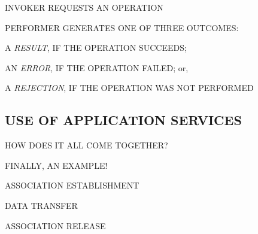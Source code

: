 \begin{bwslide}

\begin{nrtc}
\item	INVOKER REQUESTS AN OPERATION

\item	PERFORMER GENERATES ONE OF THREE OUTCOMES:
    \begin{nrtc}
    \item       A \emph{RESULT}, IF THE OPERATION SUCCEEDS;

    \item       AN \emph{ERROR}, IF THE OPERATION FAILED; or,

    \item       A \emph{REJECTION}, IF THE OPERATION WAS NOT PERFORMED
    \end{nrtc}
\end{nrtc}
\end{bwslide}






\begin{bwslide}
\part*	{USE OF APPLICATION SERVICES}\bf

\begin{nrtc}
\item	HOW DOES IT ALL COME TOGETHER?

\item	FINALLY, AN EXAMPLE!
\end{nrtc}
\end{bwslide}




\begin{bwslide}

\begin{nrtc}
\item	ASSOCIATION ESTABLISHMENT

\item	DATA TRANSFER

\item	ASSOCIATION RELEASE
\end{nrtc}
\end{bwslide}


